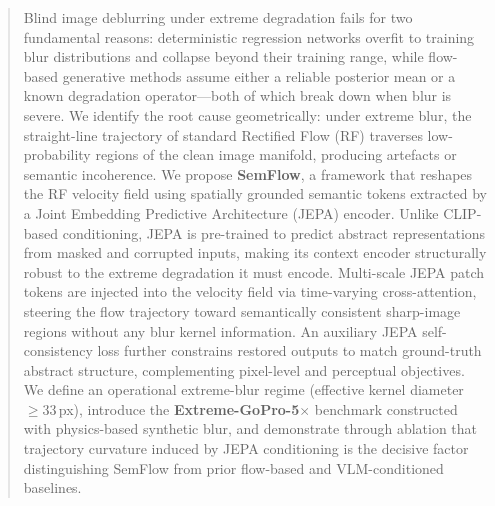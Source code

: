 \begin{abstract}
Blind image deblurring under extreme degradation fails for two
fundamental reasons: deterministic regression networks overfit to
training blur distributions and collapse beyond their training range,
while flow-based generative methods assume either a reliable posterior
mean or a known degradation operator---both of which break down when
blur is severe.
%
We identify the root cause geometrically: under extreme blur, the
straight-line trajectory of standard Rectified Flow (RF) traverses
low-probability regions of the clean image manifold, producing
artefacts or semantic incoherence.
%
We propose \textbf{SemFlow}, a framework that reshapes the RF velocity
field using spatially grounded semantic tokens extracted by a
Joint Embedding Predictive Architecture (JEPA) encoder.
%
Unlike CLIP-based conditioning, JEPA is pre-trained to predict
abstract representations from masked and corrupted inputs, making its
context encoder structurally robust to the extreme degradation it must
encode.
%
Multi-scale JEPA patch tokens are injected into the velocity field via
time-varying cross-attention, steering the flow trajectory toward
semantically consistent sharp-image regions without any blur kernel
information.
%
An auxiliary JEPA self-consistency loss further constrains restored
outputs to match ground-truth abstract structure, complementing
pixel-level and perceptual objectives.
%
We define an operational extreme-blur regime (effective kernel diameter
$\geq\!33$\,px), introduce the \textbf{Extreme-GoPro-5$\times$}
benchmark constructed with physics-based synthetic blur, and demonstrate
through ablation that trajectory curvature induced by JEPA conditioning
is the decisive factor distinguishing SemFlow from prior flow-based
and VLM-conditioned baselines.
\end{abstract}
